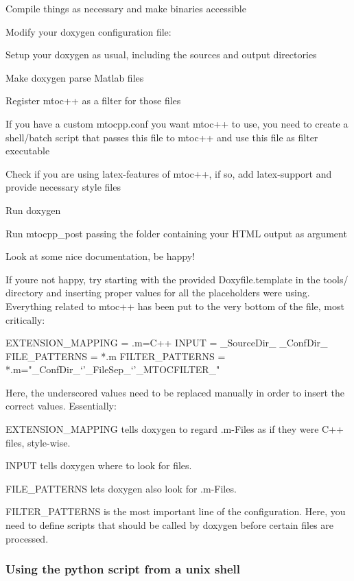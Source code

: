 \begin{DoxyItemize}
\item Compile things as necessary and make binaries accessible
\item Modify your {\ttfamily doxygen} configuration file\+:
\begin{DoxyItemize}
\item Setup your doxygen as usual, including the sources and output directories
\item Make {\ttfamily doxygen} parse Matlab files
\item Register mtoc++ as a filter for those files
\item If you have a custom mtocpp.\+conf you want mtoc++ to use, you need to create a shell/batch script that passes this file to mtoc++ and use this file as filter executable
\item Check if you are using latex-\/features of mtoc++, if so, add latex-\/support and provide necessary style files
\end{DoxyItemize}
\item Run doxygen
\item Run {\ttfamily mtocpp\+\_\+post} passing the folder containing your H\+T\+M\+L output as argument
\item Look at some nice documentation, be happy!
\item If your\textquotesingle{}e not happy, try starting with the provided Doxyfile.\+template in the {\ttfamily tools/} directory and inserting proper values for all the placeholders we\textquotesingle{}re using. Everything related to mtoc++ has been put to the very bottom of the file, most critically\+: 
\begin{DoxyCode}
EXTENSION\_MAPPING = .m=C++
INPUT             = \_SourceDir\_ \_ConfDir\_
FILE\_PATTERNS     = *.m
FILTER\_PATTERNS   = *.m=\textcolor{stringliteral}{"\_ConfDir\_`'\_FileSep\_`'\_MTOCFILTER\_"}
\end{DoxyCode}
 Here, the underscored values need to be replaced manually in order to insert the correct values. Essentially\+:
\begin{DoxyItemize}
\item {\ttfamily E\+X\+T\+E\+N\+S\+I\+O\+N\+\_\+\+M\+A\+P\+P\+I\+N\+G} tells doxygen to regard {\ttfamily }.m-\/\+Files as if they were {\ttfamily C++} files, style-\/wise.
\item {\ttfamily I\+N\+P\+U\+T} tells doxygen where to look for files.
\item {\ttfamily F\+I\+L\+E\+\_\+\+P\+A\+T\+T\+E\+R\+N\+S} lets doxygen also look for {\ttfamily }.m-\/\+Files.
\item {\ttfamily F\+I\+L\+T\+E\+R\+\_\+\+P\+A\+T\+T\+E\+R\+N\+S} is the most important line of the configuration. Here, you need to define scripts that should be called by doxygen before certain files are processed.
\end{DoxyItemize}
\end{DoxyItemize}\hypertarget{tools_tools_python}{}\subsubsection{Using the python script from a unix shell}\label{tools_tools_python}
